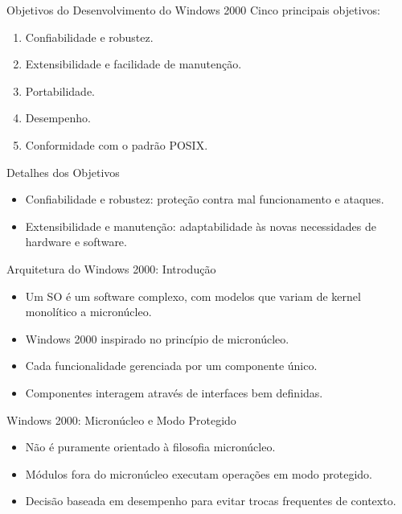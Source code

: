\documentclass{beamer}
\begin{document}
\begin{frame}{Objetivos do Desenvolvimento do Windows 2000}
    Cinco principais objetivos:
    \begin{enumerate}
        \item Confiabilidade e robustez.
        \item Extensibilidade e facilidade de manutenção.
        \item Portabilidade.
        \item Desempenho.
        \item Conformidade com o padrão POSIX.
    \end{enumerate}
\end{frame}

\begin{frame}{Detalhes dos Objetivos}
    \begin{itemize}
        \item Confiabilidade e robustez: proteção contra mal funcionamento e ataques.
        \item Extensibilidade e manutenção: adaptabilidade às novas necessidades de hardware e software.
    \end{itemize}
\end{frame}
\begin{frame}{Arquitetura do Windows 2000: Introdução}
    \begin{itemize}
        \item Um SO é um software complexo, com modelos que variam de kernel monolítico a micronúcleo.
        \item Windows 2000 inspirado no princípio de micronúcleo.
        \item Cada funcionalidade gerenciada por um componente único.
        \item Componentes interagem através de interfaces bem definidas.
    \end{itemize}
\end{frame}

\begin{frame}{Windows 2000: Micronúcleo e Modo Protegido}
    \begin{itemize}
        \item Não é puramente orientado à filosofia micronúcleo.
        \item Módulos fora do micronúcleo executam operações em modo protegido.
        \item Decisão baseada em desempenho para evitar trocas frequentes de contexto.
    \end{itemize}
\end{frame}
\end{document}
